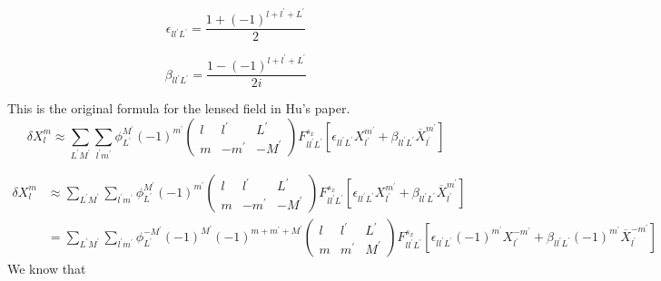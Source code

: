 \documentclass[12pt]{article}
\begin{document}
\begin{equation}
  \epsilon_{l l^{\prime} L^{\prime}}=\frac{1+(-1)^{l+l^{\prime}+L^{\prime}}}{2}
\end{equation}

\begin{equation}
  \beta_{l l^{\prime} L^{\prime}}=\frac{1-(-1)^{l+l^{\prime}+L^{\prime}}}{2 i}
\end{equation}

This is the original formula for the lensed field in Hu's paper.
\begin{equation}
  \delta X_{l}^{m} \approx \sum_{L^{\prime} M^{\prime}} \sum_{l^{\prime} m^{\prime}} \phi_{L^{\prime}}^{M^{\prime}}(-1)^{m^{\prime}}\left(\begin{array}{ccc}{l} & {l^{\prime}} & {L^{\prime}} \\ {m} & {-m^{\prime}} & {-M^{\prime}}\end{array}\right)  F_{l l^{\prime} L^{\prime}}^{s_{x}}\left[\epsilon_{l l^{\prime} L^{\prime}} X_{l^{\prime}}^{m^{\prime}}+\beta_{l l^{\prime} L^{\prime}} \overline{X}_{l^{\prime}}^{m^{\prime}}\right]
\end{equation}

\begin{align}
  \delta X_{l}^{m} &\approx \sum_{L^{\prime} M^{\prime}} \sum_{l^{\prime} m^{\prime}} \phi_{L^{\prime}}^{M^{\prime}}(-1)^{m^{\prime}}\left(\begin{array}{ccc}{l} & {l^{\prime}} & {L^{\prime}} \\ {m} & {-m^{\prime}} & {-M^{\prime}}\end{array}\right)  F_{l l^{\prime} L^{\prime}}^{s_{x}}\left[\epsilon_{l l^{\prime} L^{\prime}} X_{l^{\prime}}^{m^{\prime}}+\beta_{l l^{\prime} L^{\prime}} \overline{X}_{l^{\prime}}^{m^{\prime}}\right]\\
                   & = \sum_{L^{\prime} M^{\prime}} \sum_{l^{\prime} m^{\prime}}
                     \phi_{L^{\prime}}^{-M^{\prime}}(-1)^{M^{\prime}}(-1)^{m+m^{\prime}+M^{\prime}}\left(\begin{array}{ccc}{l} & {l^{\prime}} & {L^{\prime}} \\ {m} & {m^{\prime}} & {M^{\prime}}\end{array}\right)  F_{l l^{\prime} L^{\prime}}^{s_{x}}\left[\epsilon_{l l^{\prime} L^{\prime}}(-1)^{m^{\prime}} X_{l^{\prime}}^{-m^{\prime}}+\beta_{l l^{\prime} L^{\prime}} (-1)^{m^{\prime}}\overline{X}_{l^{\prime}}^{-m^{\prime}}\right]
\end{align}
We know that 
\end{document}
